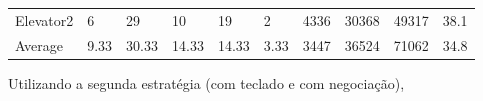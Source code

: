 ﻿\documentclass[a4paper]{article}
\begin{document}
\begin{table}[h]
\begin{tabular}{@{}llllllllll@{}}
Elevator2 & 6        & 29            & 10           & 19                                                               & 2                                                                  & 4336                                                         & 30368                                                 & 49317                                                   & 38.1         \\
Average   & 9.33     & 30.33         & 14.33        & 14.33                                                               & 3.33                                                               & 3447                                                         & 36524                                                 & 71062                                                   & 34.8          \\ \bottomrule
\end{tabular}
\end{table}

Utilizando a segunda estratégia (com teclado e com negociação),
\end{document}
